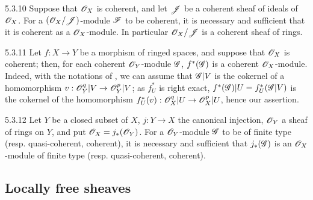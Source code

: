 \begin{env}{5.3.10}
\label{env-0.5.3.10}
Suppose that $\mathscr{O}_X$ is coherent, and let $\mathscr{J}$ be a coherent sheaf of ideals of $\mathscr{O}_X$.
For a $(\mathscr{O}_X/\mathscr{J})$-module $\mathscr{F}$ to be coherent, it is necessary and sufficient that it
is coherent as a $\mathscr{O}_X$-module. In particular $\mathscr{O}_X/\mathscr{J}$ is a coherent sheaf of rings.
\end{env}

\begin{env}{5.3.11}
\label{env-0.5.3.11}
Let $f:X\to Y$ be a morphism of ringed spaces, and suppose that $\mathscr{O}_X$ is coherent; then,
for each coherent $\mathscr{O}_Y$-module $\mathscr{G}$, $f^*(\mathscr{G})$ is a coherent $\mathscr{O}_X$-module.
Indeed, with the notations of , we can assume that $\mathscr{G}|V$ is the
cokernel of a homomorphism $v:\mathscr{O}_Y^q|V\to\mathscr{O}_Y^p|V$; as $f_U^*$ is right exact,
$f^*(\mathscr{G})|U=f_U^*(\mathscr{G}|V)$ is the cokernel of the homomorphism
$f_U^*(v):\mathscr{O}_X^q|U\to\mathscr{O}_X^p|U$, hence our assertion.
\end{env}

\begin{env}{5.3.12}
\label{env-0.5.3.12}
Let $Y$ be a closed subset of $X$, $j:Y\to X$ the canonical injection, $\mathscr{O}_Y$ a sheaf of
rings on $Y$, and put $\mathscr{O}_X=j_*(\mathscr{O}_Y)$. For a $\mathscr{O}_Y$-module $\mathscr{G}$ to be of finite type
(resp. quasi-coherent, coherent), it is necessary and sufficient that $j_*(\mathscr{G})$ is an
$\mathscr{O}_X$-module of finite type (resp. quasi-coherent, coherent).
\end{env}

\subsection{Locally free sheaves}
\label{0-prelim-5.4}

